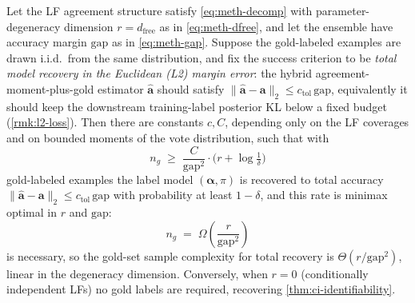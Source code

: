 \begin{theorem}
\label{thm:goldset}
Let the LF agreement structure satisfy \eqref{eq:meth-decomp} with
parameter-degeneracy dimension $r = d_{\mathrm{free}}$ as in
\eqref{eq:meth-dfree}, and let the ensemble have accuracy margin
$\mathrm{gap}$ as in \eqref{eq:meth-gap}. Suppose the gold-labeled
examples are drawn i.i.d.\ from the same distribution, and fix the
success criterion to be \emph{total model recovery in the Euclidean
(L2) margin error}: the hybrid agreement-moment-plus-gold estimator
$\hat{\bm{a}}$ should satisfy $\|\hat{\bm{a}} - \bm{a}\|_2 \le c_{\mathrm{tol}}\,
\mathrm{gap}$, equivalently it should keep the downstream training-label
posterior KL below a fixed budget (\cref{rmk:l2-loss}). Then there are
constants $c, C$, depending only on the LF coverages and on bounded
moments of the vote distribution, such that with
\begin{equation}
  n_g \;\ge\; \frac{C}{\mathrm{gap}^2}
        \cdot \bigl(r + \log\tfrac{1}{\delta}\bigr)
  \label{eq:goldset-bound}
\end{equation}
gold-labeled examples the label model $(\bm{\alpha}, \pi)$ is recovered
to total accuracy $\|\hat{\bm{a}} - \bm{a}\|_2 \le c_{\mathrm{tol}}\,\mathrm{gap}$
with probability at least $1 - \delta$, and this rate is minimax
optimal in $r$ and $\mathrm{gap}$:
\begin{equation}
  n_g \;=\; \Omega\!\left(\frac{r}{\mathrm{gap}^2}\right)
  \label{eq:goldset-lower}
\end{equation}
is necessary, so the gold-set sample complexity for total recovery is
$\Theta(r/\mathrm{gap}^2)$, linear in the degeneracy dimension.
Conversely, when $r = 0$ (conditionally independent LFs) no gold labels
are required, recovering \cref{thm:ci-identifiability}.
\end{theorem}

